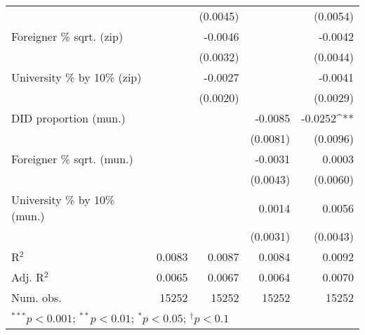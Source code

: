 \begin{tabular}{l D{.}{.}{5.7} D{.}{.}{5.7} D{.}{.}{5.7} D{.}{.}{5.11}}
                                  &               & (0.0045)      &               & (0.0054)         \\
Foreigner \% sqrt. (zip)          &               & -0.0046       &               & -0.0042          \\
                                  &               & (0.0032)      &               & (0.0044)         \\
University \% by 10\% (zip)       &               & -0.0027       &               & -0.0041          \\
                                  &               & (0.0020)      &               & (0.0029)         \\
DID proportion (mun.)             &               &               & -0.0085       & -0.0252^{**}     \\
                                  &               &               & (0.0081)      & (0.0096)         \\
Foreigner \% sqrt. (mun.)         &               &               & -0.0031       & 0.0003           \\
                                  &               &               & (0.0043)      & (0.0060)         \\
University \% by 10\% (mun.)      &               &               & 0.0014        & 0.0056           \\
                                  &               &               & (0.0031)      & (0.0043)         \\
\midrule
R$^2$                             & 0.0083        & 0.0087        & 0.0084        & 0.0092           \\
Adj. R$^2$                        & 0.0065        & 0.0067        & 0.0064        & 0.0070           \\
Num. obs.                         & 15252         & 15252         & 15252         & 15252            \\
\bottomrule
{}
\end{tabular}
